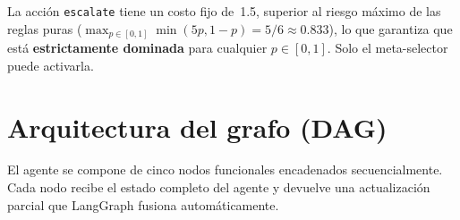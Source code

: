\documentclass[11pt,a4paper]{article}
\theoremstyle{definition}
\begin{document}
La acción \texttt{escalate} tiene un costo fijo de~1.5, superior al riesgo
máximo de las reglas puras ($\max_{p\in[0,1]}\min(5p,1-p)=5/6\approx0.833$),
lo que garantiza que está \textbf{estrictamente dominada} para cualquier
$p\in[0,1]$. Solo el meta-selector puede activarla.

\section{Arquitectura del grafo (DAG)}

El agente se compone de cinco nodos funcionales encadenados secuencialmente.
Cada nodo recibe el estado completo del agente y devuelve una actualización
parcial que LangGraph fusiona automáticamente.
\end{document}
